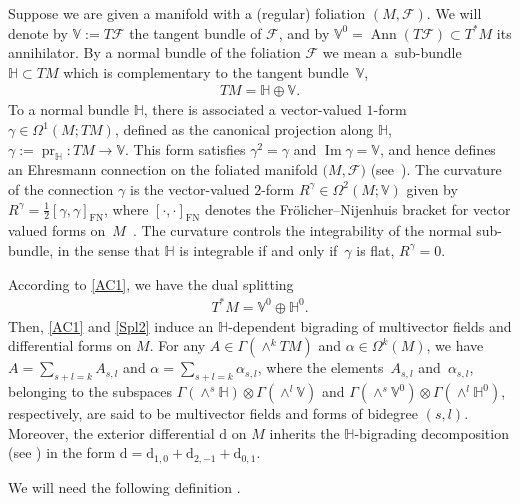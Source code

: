 \documentclass[pdftex]{sigma}
\numberwithin{equation}{section}
\begin{document}
Suppose we are given a manifold with a (regular) foliation $(M,\mathcal{F})$. We will denote by $\mathbb{V}:=T\mathcal{F}$ the tangent bundle of $\mathcal{F}$, and by $\mathbb{V}^{0}=\operatorname*{Ann}(T\mathcal{F})\subset T^{\ast}M$ its annihilator. By a normal bundle of the foliation $\mathcal{F}$ we mean a~sub-bundle $\mathbb{H}\subset TM$ which is complementary to the tangent bundle~$\mathbb{V}$,
\begin{gather}
TM=\mathbb{H}\oplus\mathbb{V}.\label{AC1}
\end{gather}
To a normal bundle $\mathbb{H}$, there is associated a vector-valued $1$-form $\gamma\in\Omega^{1}(M;TM)$, def\/ined as the canonical projection along $\mathbb{H}$, $\gamma := \operatorname{pr}_{\mathbb{H}}\colon TM\rightarrow\mathbb{V}$. This form satisf\/ies $\gamma^{2}=\gamma$ and $\operatorname{Im}\gamma=\mathbb{V}$, and hence def\/ines an Ehresmann connection on the foliated manifold $(M,\mathcal{F)}$ (see~\cite{KMS-93}). The curvature of the connection $\gamma$ is the vector-valued $2$-form $R^{\gamma}\in\Omega^{2}(M;\mathbb{V})$ given by $R^{\gamma}=\frac{1}{2}[\gamma,\gamma]_{\operatorname*{FN}}$, where $[\cdot ,\cdot ]_{\operatorname*{FN}}$ denotes the Fr\"{o}licher--Nijenhuis bracket for vector valued forms on~$M$~\cite{KMS-93}. The curvature controls the integrability of the normal sub-bundle, in the sense that $\mathbb{H}$ is integrable if and only if~$\gamma$ is f\/lat, $R^{\gamma}=0$.

According to \eqref{AC1}, we have the dual splitting
\begin{gather}
T^{\ast}M=\mathbb{V}^{0}\oplus\mathbb{H}^{0}. \label{Spl2}
\end{gather}
Then, \eqref{AC1} and \eqref{Spl2} induce an $\mathbb{H}$-dependent bigrading of multivector f\/ields and dif\/ferential forms on $M$. For any $A\in
\Gamma(\wedge^{k}TM)$ and $\alpha\in\Omega^{k}(M)$, we have $A=\sum\limits _{s+l=k}A_{s,l}$ and $\alpha=\sum\limits_{s+l=k}\alpha_{s,l}$, where the elements~$A_{s,l}$ and~$\alpha_{s,l}$, belonging to the subspaces $\Gamma(\wedge^{s}\mathbb{H})\otimes\Gamma(\wedge^{l}\mathbb{V})$ and $\Gamma(\wedge ^{s}\mathbb{V}^{0})\otimes\Gamma(\wedge^{l}\mathbb{H}^{0})$, respectively, are said to be multivector f\/ields and forms of bidegree $(s,l)$. Moreover, the exterior dif\/ferential $\mathrm{d}$ on $M$ inherits the $\mathbb{H}$-bigrading decomposition (see \cite{Va-04}) in the form
$\mathrm{d}=\mathrm{d}_{1,0}+\mathrm{d}_{2,-1}+\mathrm{d}_{0,1}$.

We will need the following def\/inition \cite{Va-04, Vo-01}.
\end{document}
